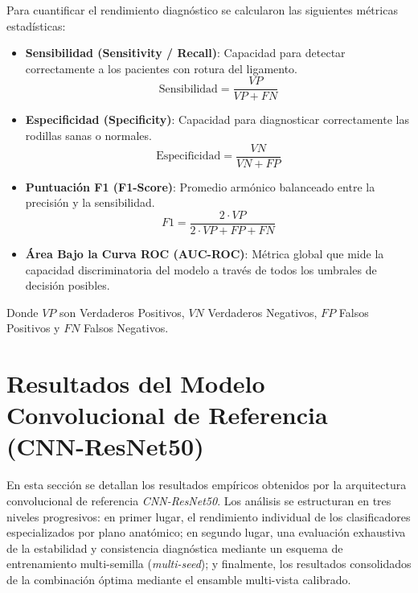 Para cuantificar el rendimiento diagnóstico se calcularon las siguientes métricas estadísticas:
\begin{itemize}
    \item \textbf{Sensibilidad (Sensitivity / Recall)}: Capacidad para detectar correctamente a los pacientes con rotura del ligamento.
    \begin{equation}
        \text{Sensibilidad} = \frac{VP}{VP + FN}
    \end{equation}
    \item \textbf{Especificidad (Specificity)}: Capacidad para diagnosticar correctamente las rodillas sanas o normales.
    \begin{equation}
        \text{Especificidad} = \frac{VN}{VN + FP}
    \end{equation}
    \item \textbf{Puntuación F1 (F1-Score)}: Promedio armónico balanceado entre la precisión y la sensibilidad.
    \begin{equation}
        F1 = \frac{2 \cdot VP}{2 \cdot VP + FP + FN}
    \end{equation}
    \item \textbf{Área Bajo la Curva ROC (AUC-ROC)}: Métrica global que mide la capacidad discriminatoria del modelo a través de todos los umbrales de decisión posibles.
\end{itemize}
Donde $VP$ son Verdaderos Positivos, $VN$ Verdaderos Negativos, $FP$ Falsos Positivos y $FN$ Falsos Negativos.

\section{Resultados del Modelo Convolucional de Referencia (CNN-ResNet50)}
\label{sec:resultados_resnet50}

En esta sección se detallan los resultados empíricos obtenidos por la arquitectura convolucional de referencia \textit{CNN-ResNet50}. Los análisis se estructuran en tres niveles progresivos: en primer lugar, el rendimiento individual de los clasificadores especializados por plano anatómico; en segundo lugar, una evaluación exhaustiva de la estabilidad y consistencia diagnóstica mediante un esquema de entrenamiento multi-semilla (\textit{multi-seed}); y finalmente, los resultados consolidados de la combinación óptima mediante el ensamble multi-vista calibrado.


